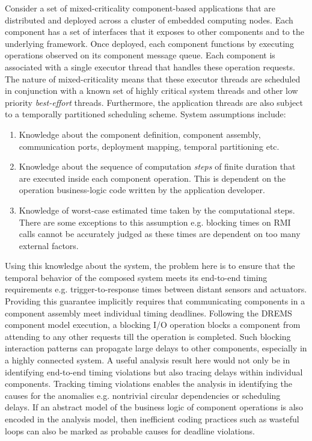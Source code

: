 Consider a set of mixed-criticality component-based applications that are distributed and deployed across a cluster of embedded computing nodes. Each component has a set of interfaces that it exposes to other components and to the underlying framework. Once deployed, each component functions by executing operations observed on its component message queue. Each component is associated with a single executor thread that handles these operation requests. The nature of mixed-criticality means that these executor threads are scheduled in conjunction with a known set of highly critical system threads and other low priority \emph{best-effort} threads. Furthermore, the application threads are also subject to a temporally partitioned scheduling scheme. System assumptions include:

\begin{enumerate}
	\item Knowledge about the component definition, component assembly, communication ports, deployment mapping, temporal partitioning etc. 
	
	\item Knowledge about the sequence of computation \emph{steps} of finite duration that are executed inside each component operation. This is dependent on the operation business-logic code written by the application developer.
	
	\item Knowledge of worst-case estimated time taken by the computational steps. There are some exceptions to this assumption e.g. blocking times on RMI calls cannot be accurately judged as these times are dependent on too many external factors.
\end{enumerate}

Using this knowledge about the system, the problem here is to ensure that the temporal behavior of the composed system meets its end-to-end timing requirements e.g. trigger-to-response times between distant sensors and actuators. Providing this guarantee implicitly requires that communicating components in a component assembly meet individual timing deadlines. Following the DREMS component model execution, a blocking I/O operation blocks a component from attending to any other requests till the operation is completed. Such blocking interaction patterns can propagate large delays to other components, especially in a highly connected system. A useful analysis result here would not only be in identifying end-to-end timing violations but also tracing delays within individual components. Tracking timing violations enables the analysis in identifying the causes for the anomalies e.g. nontrivial circular dependencies or scheduling delays. If an abstract model of the business logic of component operations is also encoded in the analysis model, then inefficient coding practices such as wasteful loops can also be marked as probable causes for deadline violations. 

